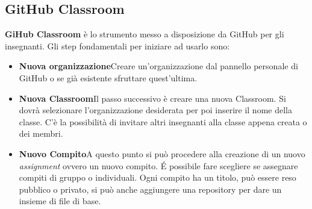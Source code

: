 		\subsection{GitHub Classroom}\label{def:Classroom}
				\begin{center}
			\end{center}
		
			\textbf{GiHub Classroom} è lo strumento messo a disposizione da GitHub per gli insegnanti. Gli step fondamentali per iniziare ad usarlo sono:
			\begin{itemize}
				\item\textbf{Nuova organizzazione}\quad Creare un'organizzazione dal pannello personale di GitHub o se già esistente sfruttare quest'ultima.
				\item\textbf{Nuova Classroom}\quad Il passo successivo è creare una nuova Classroom. Si dovrà selezionare l'organizzazione desiderata per poi inserire il nome della classe. C'è la possibilità di invitare altri insegnanti alla classe appena creata o dei membri.
				\item\textbf{Nuovo Compito}\quad A questo punto si può procedere alla creazione di un nuovo \textit{assignment} ovvero un nuovo compito.  \'E possibile fare scegliere se assegnare compiti di gruppo o individuali. Ogni compito ha un titolo, può essere reso pubblico o privato, si può anche aggiungere una repository per dare un insieme di file di base.  
			\end{itemize}
			
			
			
			